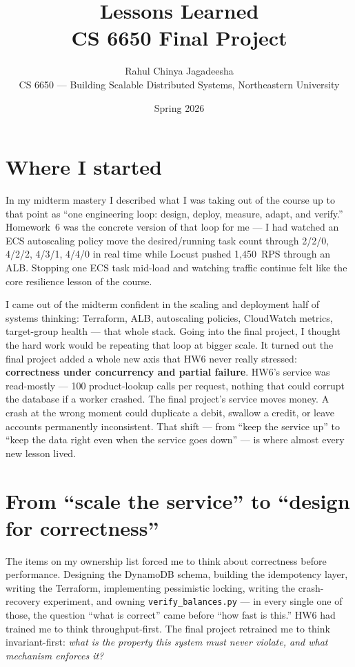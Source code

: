 \documentclass[11pt,a4paper]{article}
\title{\vspace{-1.5em}\textbf{\color{accentblue}Lessons Learned} \\ \large CS 6650 Final Project \vspace{-0.3em}}
\author{Rahul Chinya Jagadeesha \\ \small CS 6650 --- Building Scalable Distributed Systems, Northeastern University}
\date{\vspace{-0.5em}\small Spring 2026}
\begin{document}
\maketitle
\thispagestyle{fancy}
\vspace{-2em}

\section*{Where I started}

\begin{openingbox}
In my midterm mastery I described what I was taking out of the course up to that point as ``one engineering loop: design, deploy, measure, adapt, and verify.'' Homework~6 was the concrete version of that loop for me --- I had watched an ECS autoscaling policy move the desired/running task count through 2/2/0, 4/2/2, 4/3/1, 4/4/0 in real time while Locust pushed 1{,}450~RPS through an ALB. Stopping one ECS task mid-load and watching traffic continue felt like the core resilience lesson of the course.
\end{openingbox}

I came out of the midterm confident in the scaling and deployment half of systems thinking: Terraform, ALB, autoscaling policies, CloudWatch metrics, target-group health --- that whole stack. Going into the final project, I thought the hard work would be repeating that loop at bigger scale. It turned out the final project added a whole new axis that HW6 never really stressed: \textbf{correctness under concurrency and partial failure}. HW6's service was read-mostly --- 100 product-lookup calls per request, nothing that could corrupt the database if a worker crashed. The final project's service moves money. A crash at the wrong moment could duplicate a debit, swallow a credit, or leave accounts permanently inconsistent. That shift --- from ``keep the service up'' to ``keep the data right even when the service goes down'' --- is where almost every new lesson lived.

\section{From ``scale the service'' to ``design for correctness''}

The items on my ownership list forced me to think about correctness before performance. Designing the DynamoDB schema, building the idempotency layer, writing the Terraform, implementing pessimistic locking, writing the crash-recovery experiment, and owning \texttt{verify\_balances.py} --- in every single one of those, the question ``what is correct'' came before ``how fast is this.'' HW6 had trained me to think throughput-first. The final project retrained me to think invariant-first: \textit{what is the property this system must never violate, and what mechanism enforces it?}
\end{document}
